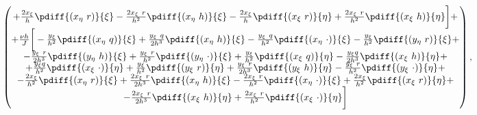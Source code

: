 {{\begin{align}
\begin{pmatrix}
		+ \frac{2 x_{\xi}}{h} \pdiff{(x_{\eta}\ r)}{\xi}
		- \frac{2 x_{\xi}\ r}{h^2} \pdiff{(x_{\eta}\ h)}{\xi}
		- \frac{2 x_{\xi}}{h} \pdiff{(x_{\xi}\ r)}{\eta}
		+ \frac{2 x_{\xi}\ r}{h^2} \pdiff{(x_{\xi}\ h)}{\eta}
		\bigg] + \\
		+		\frac{\nu h}{J} \bigg[
		-\frac{y_{\xi} }{h^2} \pdiff{(x_{\eta}\ q)}{\xi}
		+ \frac{y_{\xi}\ q}{2h^3} \pdiff{(x_{\eta}\ h)}{\xi}
		- \frac{y_{\xi}\ q}{h^2} \pdiff{(x_{\eta}\ \cdot)}{\xi}
		- \frac{y_{\xi} }{h^2} \pdiff{(y_{\eta}\ r)}{\xi}  + \\
		- \frac{y_{\xi}\ r}{2h^3} \pdiff{(y_{\eta}\ h)}{\xi}
		+ \frac{y_{\xi}\ r}{h^2} \pdiff{(y_{\eta}\ \cdot)}{\xi}
		+ \frac{y_{\xi}}{h^2} \pdiff{(x_{\xi}\ q)}{\eta}
		- \frac{y_{\xi}q}{2h^3} \pdiff{(x_{\xi}\ h)}{\eta}  + \\
		+ \frac{y_{\xi}q}{h^2} \pdiff{(x_{\xi}\ \cdot)}{\eta}
		+ \frac{y_{\xi}}{h^2} \pdiff{(y_{\xi}\ r)}{\eta}
		+ \frac{y_{\xi}\ r}{2h^3} \pdiff{(y_{\xi}\ h)}{\eta}
		- \frac{y_{\xi}\ r}{h^2} \pdiff{(y_{\xi}\ \cdot)}{\eta} + \\
		- \frac{2 x_{\xi}}{h^2} \pdiff{(x_{\eta}\ r)}{\xi}
		+ \frac{2 x_{\xi}\ r}{2h^3} \pdiff{(x_{\eta}\ h)}{\xi}
		- \frac{2 x_{\xi}\ r}{h^2} \pdiff{(x_{\eta}\ \cdot)}{\xi}
		+ \frac{2 x_{\xi}}{h^2} \pdiff{(x_{\xi}\ r)}{\eta}  + \\
		- \frac{2 x_{\xi}\ r}{2h^3} \pdiff{(x_{\xi}\ h)}{\eta}
		+ \frac{2 x_{\xi}\ r}{h^2} \pdiff{(x_{\xi}\ \cdot)}{\eta}
		\bigg]
	\end{pmatrix},
\end{align}

}}
